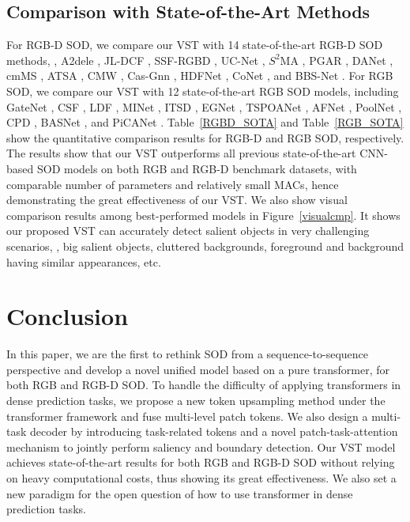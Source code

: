 \documentclass[10pt,twocolumn,letterpaper]{article}
\begin{document}
\subsection{Comparison with State-of-the-Art Methods}
For RGB-D SOD, we compare our VST with 14 state-of-the-art RGB-D SOD methods, \ie, A2dele \cite{piao2020a2dele}, JL-DCF \cite{Fu2020JLDCF}, SSF-RGBD \cite{zhang2020select}, UC-Net \cite{zhang2020ucnet}, $S^2$MA \cite{liu2020S2MA}, PGAR \cite{chen2020PGAR}, DANet \cite{zhao2020DANet}, cmMS \cite{li2020cmMS}, ATSA \cite{zhang2020ATSA}, CMW \cite{Li2020CMWNet}, Cas-Gnn \cite{luo2020Cas-Gnn}, HDFNet \cite{HDFNet-ECCV2020}, CoNet \cite{Wei2020CoNet}, and BBS-Net \cite{fan2020bbsnet}.
For RGB SOD, we compare our VST with 12 state-of-the-art RGB SOD models, including GateNet \cite{GateNet}, CSF \cite{gao2020sod100k}, LDF \cite{CVPR2020_LDF}, MINet \cite{MINet-CVPR2020}, ITSD \cite{Zhou2020ITSD}, EGNet \cite{zhao2019EGNet}, TSPOANet \cite{Liu_TSPOANet}, AFNet \cite{Feng_AFNet}, PoolNet \cite{Liu19PoolNet}, CPD \cite{Wu_CPD}, BASNet \cite{Qin19BASNet}, and PiCANet \cite{liu2018picanet}. 
Table~\ref{RGBD_SOTA} and Table~\ref{RGB_SOTA} show the quantitative comparison results for RGB-D and RGB SOD, respectively.
The results show that our VST outperforms all previous state-of-the-art CNN-based SOD models on both RGB and RGB-D benchmark datasets, with comparable number of parameters and relatively small MACs, hence demonstrating the great effectiveness of our VST.
We also show visual comparison results among best-performed models in Figure~\ref{visualcmp}. It shows our proposed VST can accurately detect salient objects in very challenging scenarios, \eg, big salient objects, cluttered backgrounds, foreground and background having similar appearances, etc.

\section{Conclusion}
In this paper, we are the first to rethink SOD from a sequence-to-sequence perspective and develop a novel unified model based on a pure transformer, for both RGB and RGB-D SOD. To handle the difficulty of applying transformers in dense prediction tasks, we propose a new token upsampling method under the transformer framework and fuse multi-level patch tokens. We also design a multi-task decoder by introducing task-related tokens and a novel patch-task-attention mechanism to jointly perform saliency and boundary detection. Our VST model achieves state-of-the-art results for both RGB and RGB-D SOD without relying on heavy computational costs, thus showing its great effectiveness. We also set a new paradigm for the open question of how to use transformer in dense prediction tasks. 
\end{document}
